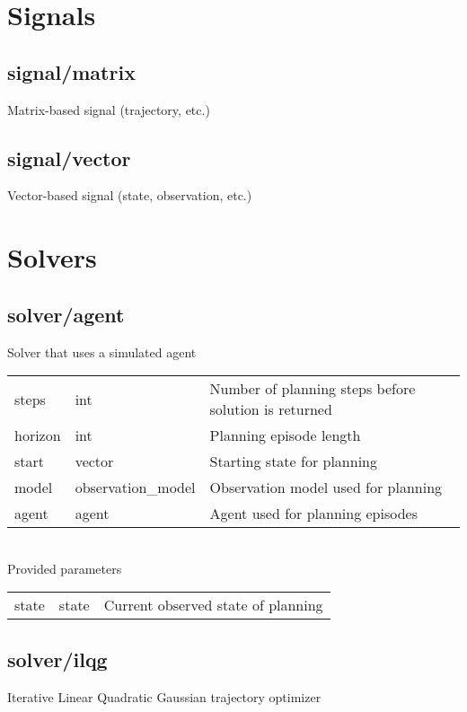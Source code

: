 \section{Signals}
\subsection{signal/matrix}
\noindent Matrix-based signal (trajectory, etc.)\\

\subsection{signal/vector}
\noindent Vector-based signal (state, observation, etc.)\\

\section{Solvers}
\subsection{solver/agent}
\noindent Solver that uses a simulated agent\\

\noindent\begin{tabular}{@{}lll@{}}
steps&int&Number of planning steps before solution is returned\\
horizon&int&Planning episode length\\
start&vector&Starting state for planning\\
model&observation\_model&Observation model used for planning\\
agent&agent&Agent used for planning episodes\\
\end{tabular}
\\

\noindent Provided parameters\\

\noindent\begin{tabular}{@{}lll@{}}
state&state&Current observed state of planning\\
\end{tabular}
\subsection{solver/ilqg}
\noindent Iterative Linear Quadratic Gaussian trajectory optimizer\\

